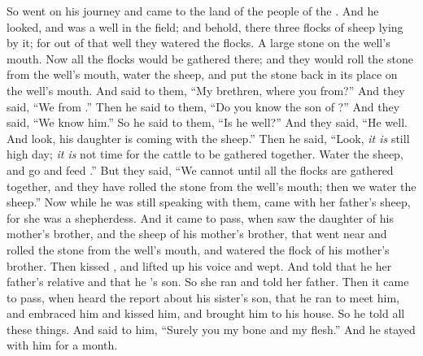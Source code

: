 
\bverse So \Jacob went on his journey and came to the land of the people of the .
\bverse And he looked, and was a well in the field; and behold, there \were three flocks of sheep lying by it; for out of that well they watered the flocks. A large stone \was on the well's mouth.
\bverse Now all the flocks would be gathered there; and they would roll the stone from the well's mouth, water the sheep, and put the stone back in its place on the well's mouth.
\bverse And \Jacob said to them, ``My brethren, where \are you from?'' And they said, ``We \are from \Haran.''
\bverse Then he said to them, ``Do you know \Laban the son of ?'' And they said, ``We know him.''
\bverse So he said to them, ``Is he well?'' And they said, ``He \is well. And look, his daughter \Rachel is coming with the sheep.''
\bverse Then he said, ``Look, \textit{it is} still high day; \textit{it is} not time for the cattle to be gathered together. Water the sheep, and go and feed \them.''
\bverse But they said, ``We cannot until all the flocks are gathered together, and they have rolled the stone from the well's mouth; then we water the sheep.''
\bverse Now while he was still speaking with them, \Rachel came with her father's sheep, for she was a shepherdess.
\bverse And it came to pass, when \Jacob saw \Rachel the daughter of \Laban his mother's brother, and the sheep of \Laban his mother's brother, that \Jacob went near and rolled the stone from the well's mouth, and watered the flock of \Laban his mother's brother.
\bverse Then \Jacob kissed \Rachel, and lifted up his voice and wept.
\bverse And \Jacob told \Rachel that he \was her father's relative and that he \was \Rebekah's son. So she ran and told her father.
\bverse Then it came to pass, when \Laban heard the report about \Jacob his sister's son, that he ran to meet him, and embraced him and kissed him, and brought him to his house. So he told \Laban all these things.
\bverse And \Laban said to him, ``Surely you \are my bone and my flesh.'' And he stayed with him for a month.


